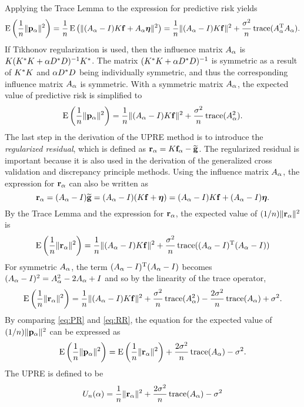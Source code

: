 \noindent Applying the Trace Lemma to the expression for predictive risk yields
\[\operatorname{E}\left(\frac{1}{n}\|\mathbf{p}_{\alpha}\|^2\right) = \frac{1}{n}\operatorname{E}\left(\|(A_{\alpha}-I)K\mathbf{f} + A_{\alpha}\bm{\eta}\|^2\right) = \frac{1}{n}\|(A_{\alpha}-I)K\mathbf{f}\|^2 + \frac{\sigma^2}{n}\operatorname{trace}({A_{\alpha}^{\mathrm{T}}}A_{\alpha}).\]
If Tikhonov regularization is used, then the influence matrix $A_{\alpha}$ is $K(K^*K + \alpha{D^*}D)^{-1}K^*$. The matrix $(K^*K + \alpha{D^*}D)^{-1}$ is symmetric as a result of $K^*K$ and $\alpha{D^*}D$ being individually symmetric, and thus the corresponding influence matrix $A_{\alpha}$ is symmetric.  With a symmetric matrix $A_{\alpha}$, the expected value of predictive risk is simplified to
\begin{equation}
\label{eq:PR}
\operatorname{E}\left(\frac{1}{n}\|\mathbf{p}_{\alpha}\|^2\right) = \frac{1}{n}\|(A_{\alpha}-I)K\mathbf{f}\|^2 + \frac{\sigma^2}{n}\operatorname{trace}(A_{\alpha}^2).
\end{equation}
\indent The last step in the derivation of the UPRE method is to introduce the \textit{regularized residual}, which is defined as $\mathbf{r}_{\alpha} = K\mathbf{f}_{\alpha} - \widetilde{\mathbf{g}}$. The regularized residual is important because it is also used in the derivation of the generalized cross validation and discrepancy principle methods. Using the influence matrix $A_{\alpha}$, the expression for $\mathbf{r}_{\alpha}$ can also be written as
\[\mathbf{r}_{\alpha} = (A_{\alpha}-I)\widetilde{\mathbf{g}} = (A_{\alpha}-I)(K\mathbf{f} + \bm{\eta}) = (A_{\alpha}-I)K\mathbf{f} + (A_{\alpha}-I)\bm{\eta}.\]
By the Trace Lemma and the expression for $\mathbf{r}_{\alpha}$, the expected value of $(1/n)\|\mathbf{r}_{\alpha}\|^2$ is
\[\operatorname{E}\left(\frac{1}{n}\|\mathbf{r}_{\alpha}\|^2\right) = \frac{1}{n}\|(A_{\alpha}-I)K\mathbf{f}\|^2 + \frac{\sigma^2}{n}\operatorname{trace}({(A_{\alpha}-I)^{\mathrm{T}}}(A_{\alpha}-I))\]
For symmetric $A_{\alpha}$, the term $(A_{\alpha}-I)^{\mathrm{T}}(A_{\alpha}-I)$ becomes $(A_{\alpha}-I)^2 = A_{\alpha}^2 - 2A_{\alpha} + I$ and so by the linearity of the trace operator,
\begin{equation}
\label{eq:RR}
\operatorname{E}\left(\frac{1}{n}\|\mathbf{r}_{\alpha}\|^2\right) = \frac{1}{n}\|(A_{\alpha}-I)K\mathbf{f}\|^2 + \frac{\sigma^2}{n}\operatorname{trace}(A_{\alpha}^2) - \frac{2\sigma^2}{n}\operatorname{trace}(A_{\alpha}) + \sigma^2.
\end{equation}
By comparing \eqref{eq:PR} and \eqref{eq:RR}, the equation for the expected value of $(1/n)\|\mathbf{p}_{\alpha}\|^2$ can be expressed as
\[\operatorname{E}\left(\frac{1}{n}\|\mathbf{p}_{\alpha}\|^2\right) = \operatorname{E}\left(\frac{1}{n}\|\mathbf{r}_{\alpha}\|^2\right) + \frac{2\sigma^2}{n}\operatorname{trace}(A_{\alpha}) - \sigma^2.\]
The UPRE is defined to be
\begin{equation}
\label{eq:UPRE}
U_n(\alpha) = \frac{1}{n}\|\mathbf{r}_{\alpha}\|^2 + \frac{2\sigma^2}{n}\operatorname{trace}(A_{\alpha}) - \sigma^2
\end{equation}
